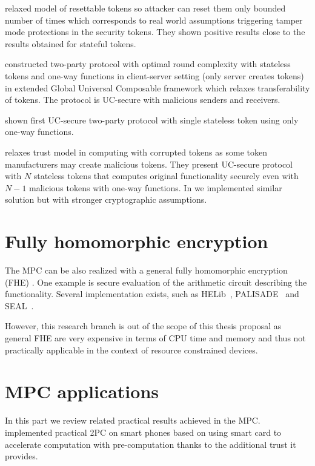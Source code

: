 \documentclass[
  digital, %
  twoside, %
  table,   %
  lof,     %
  lot,     %
]{fithesis3}
\begin{document}
\cite{DKMN15} relaxed model of resettable tokens so attacker can reset them only bounded number of times which corresponds to real world assumptions triggering tamper mode protections in the security tokens. They shown positive results close to the results obtained for stateful tokens. 

\cite{HPV16} constructed two-party protocol with optimal round complexity with stateless tokens and one-way functions in client-server setting (only server creates tokens) in extended Global Universal Composable framework which relaxes transferability of tokens. The protocol is UC-secure with malicious senders and receivers.

\cite{DKMN15b} shown first UC-secure two-party protocol with single stateless token using only one-way functions.

\cite{CCOV17} relaxes trust model in computing with corrupted tokens as some token manufacturers may create malicious tokens. They present UC-secure protocol with $N$ stateless tokens that computes original functionality securely even with $N-1$ malicious tokens with one-way functions. In \cite{2017-ccs-mavroudis} we implemented similar solution but with stronger cryptographic assumptions.



\section{Fully homomorphic encryption} %
The MPC can be also realized with a general fully homomorphic encryption (FHE) \cite{Gentry:2009:FHE:1536414.1536440, 10.1007/978-3-642-13190-5_2, cryptoeprint:2011:133, cryptoeprint:2012:099, 10.1007/978-3-642-40041-4_5, 10.1007/978-3-642-36362-7_1, 10.1007/978-3-642-55220-5_30}. One example is secure evaluation of the arithmetic circuit describing the functionality. Several implementation exists, such as HELib~\cite{helib}, PALISADE~\cite{palisade} and SEAL~\cite{seal}.

However, this research branch is out of the scope of this thesis proposal as general FHE are very expensive in terms of CPU time and memory and thus not practically applicable in the context of resource constrained devices.

\section{MPC applications}
In this part we review related practical results achieved in the MPC.
\cite{DSZ14} implemented practical 2PC on smart phones based on \cite{GMW87} using smart card to accelerate computation with pre-computation thanks to the additional trust it provides.
\end{document}
